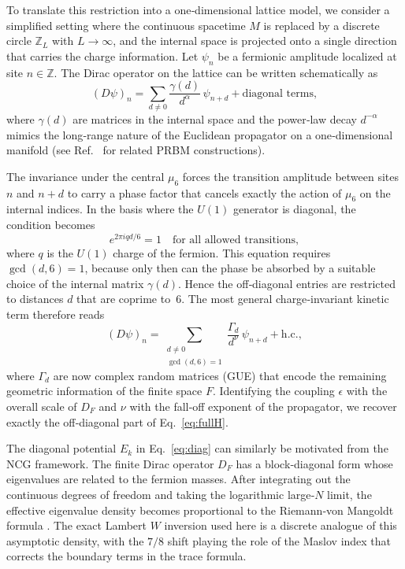 \documentclass[11pt,a4paper]{article}
\begin{document}
To translate this restriction into a one‑dimensional lattice model, we consider a simplified setting where the continuous spacetime $M$ is replaced by a discrete circle $\mathbb{Z}_L$ with $L\to\infty$, and the internal space is projected onto a single direction that carries the charge information. Let $\psi_n$ be a fermionic amplitude localized at site $n\in\mathbb{Z}$. The Dirac operator on the lattice can be written schematically as
\begin{equation}
(D\psi)_n = \sum_{d\neq 0} \frac{\gamma(d)}{d^{\alpha}} \, \psi_{n+d} + \text{diagonal terms},
\end{equation}
where $\gamma(d)$ are matrices in the internal space and the power‑law decay $d^{-\alpha}$ mimics the long‑range nature of the Euclidean propagator on a one‑dimensional manifold (see Ref.~\cite{Mirlin1996} for related PRBM constructions).

The invariance under the central $\mu_6$ forces the transition amplitude between sites $n$ and $n+d$ to carry a phase factor that cancels exactly the action of $\mu_6$ on the internal indices. In the basis where the $U(1)$ generator is diagonal, the condition becomes
\begin{equation}
e^{2\pi i q d /6} = 1 \quad \text{for all allowed transitions},
\end{equation}
where $q$ is the $U(1)$ charge of the fermion. This equation requires $\gcd(d,6)=1$, because only then can the phase be absorbed by a suitable choice of the internal matrix $\gamma(d)$. Hence the off‑diagonal entries are restricted to distances $d$ that are coprime to~6. The most general charge‑invariant kinetic term therefore reads
\begin{equation}
(D\psi)_n = \sum_{\substack{d\neq 0 \\ \gcd(d,6)=1}} \frac{\Gamma_d}{d^{\nu}} \, \psi_{n+d} + \text{h.c.},
\end{equation}
where $\Gamma_d$ are now complex random matrices (GUE) that encode the remaining geometric information of the finite space $F$. Identifying the coupling $\epsilon$ with the overall scale of $D_F$ and $\nu$ with the fall‑off exponent of the propagator, we recover exactly the off‑diagonal part of Eq.~\eqref{eq:fullH}.

The diagonal potential $E_k$ in Eq.~\eqref{eq:diag} can similarly be motivated from the NCG framework. The finite Dirac operator $D_F$ has a block‑diagonal form whose eigenvalues are related to the fermion masses. After integrating out the continuous degrees of freedom and taking the logarithmic large‑$N$ limit, the effective eigenvalue density becomes proportional to the Riemann‑von Mangoldt formula \cite{Connes1999}. The exact Lambert $W$ inversion used here is a discrete analogue of this asymptotic density, with the $7/8$ shift playing the role of the Maslov index that corrects the boundary terms in the trace formula.
\end{document}
